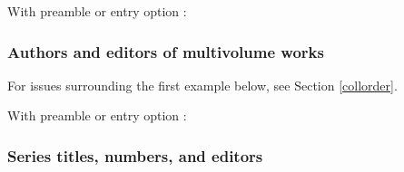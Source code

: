 \documentclass[11pt,letterpaper,oneside]{article}
\begin{document}
\noindent With preamble or entry option :

\begin{citebib}
\item \cite[351]{lach1977}
\item \cite{harley1994}
\end{citebib}

\subsubsection{Authors and editors of multivolume works}
\label{14.122}

For issues surrounding the first example below, see Section
\ref{collorder}.

\begin{citebib}
\item \cite{barrows1959}
\item \cite{donne1995}
\end{citebib}

\noindent With preamble or entry option :


\begin{citebib}
\item \cite{barrows1959}
\item \cite*{donne1995}
\newrefcontext[sorting=reverse]
\end{citebib}
\newrefcontext[sorting=nty]

\subsubsection{Series titles, numbers, and editors}
\label{14.123}

\begin{citebib}
\item \cite{lei2014}
\item \cite{mazrim2011}
\item \cite{wauchope1950}
\item \cite{allen2009}
\end{citebib}
\end{document}
